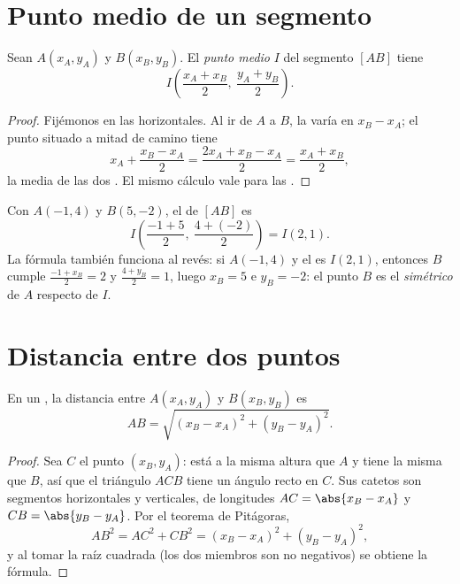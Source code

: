 \section{Punto medio de un segmento}

\begin{proposition}\label{prop:g10:coordgeom:midpoint}
Sean $A(x_A, y_A)$ y $B(x_B, y_B)$. El \emph{punto medio} $I$ del segmento $[AB]$ tiene 
\[
I\left(\frac{x_A + x_B}{2},\ \frac{y_A + y_B}{2}\right).
\]
\end{proposition}

\begin{proof}
Fijémonos en las  horizontales. Al ir de $A$ a $B$, la 
varía en $x_B - x_A$; el punto situado a mitad de camino tiene 
\[
x_A + \frac{x_B - x_A}{2} = \frac{2x_A + x_B - x_A}{2}
= \frac{x_A + x_B}{2},
\]
la media de las dos . El mismo cálculo vale para las .
\end{proof}

\begin{example}\label{ex:g10:coordgeom:midpoint}
Con $A(-1, 4)$ y $B(5, -2)$, el  de $[AB]$ es
\[
I\left(\frac{-1 + 5}{2},\ \frac{4 + (-2)}{2}\right) = I(2, 1).
\]
La fórmula también funciona al revés: si $A(-1, 4)$ y el  es
$I(2, 1)$, entonces $B$ cumple $\frac{-1 + x_B}{2} = 2$ y
$\frac{4 + y_B}{2} = 1$, luego $x_B = 5$ e $y_B = -2$: el punto $B$ es el
\emph{simétrico} de $A$ respecto de $I$.
\end{example}

\section{Distancia entre dos puntos}

\begin{theorem}\label{thm:g10:coordgeom:distance}
En un , la distancia entre $A(x_A, y_A)$ y
$B(x_B, y_B)$ es
\[
AB = \sqrt{(x_B - x_A)^2 + (y_B - y_A)^2}.
\]
\end{theorem}

\begin{proof}
Sea $C$ el punto $(x_B, y_A)$: está a la misma altura que $A$ y tiene la
misma  que $B$, así que el triángulo $ACB$ tiene un ángulo recto en
$C$. Sus catetos son segmentos horizontales y verticales, de longitudes
$AC = \abs{x_B - x_A}$ y $CB = \abs{y_B - y_A}$. Por el teorema de
Pitágoras,
\[
AB^2 = AC^2 + CB^2 = (x_B - x_A)^2 + (y_B - y_A)^2,
\]
y al tomar la raíz cuadrada (los dos miembros son no negativos) se obtiene
la fórmula.
\end{proof}

